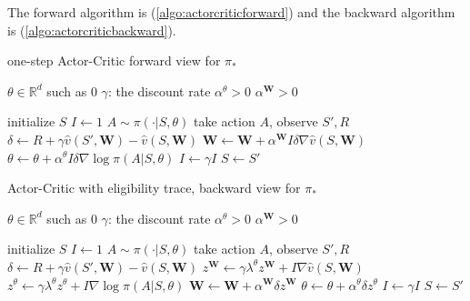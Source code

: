 The forward algorithm is (\ref{algo:actorcriticforward}) and the backward algorithm is (\ref{algo:actorcriticbackward}).


\begin{algorithm}
	\caption{one-step Actor-Critic forward view for $\pi_*$}\label{algo:actorcriticforward}	
	
	\begin{algorithmic}[1]
		\State $ \theta \in \mathbb{R}^d $ such as $0$
		\State $\gamma$: the discount rate
		\State $\alpha^\theta > 0$
		\State $\alpha^{\mathbf{W}} > 0$
		
		\Statex
		
		\Loop
			\State initialize $S$
			\State $I \gets 1$
			\Repeat
				\State $A \sim \pi(\cdot|S,\theta)$
				\State take action $A$, observe $S', R$
				\State $\delta \gets R + \gamma \widehat{v}(S',\mathbf{W}) - \widehat{v}(S,\mathbf{W})$ 
				\State $\mathbf{W} \gets \mathbf{W} + \alpha^{\mathbf{W}} I \delta \nabla \widehat{v}(S, \mathbf{W}) $
				\State $\theta \gets \theta + \alpha^\theta I \delta \nabla \log \pi(A|S,\theta) $
				\State $I \gets \gamma I$
				\State $S \gets S'$
		\EndLoop		
	\end{algorithmic}
\end{algorithm}


\begin{algorithm}
	\caption{Actor-Critic with eligibility trace, backward view for $\pi_*$}\label{algo:actorcriticbackward}	
	
	\begin{algorithmic}[1]
		\State $ \theta \in \mathbb{R}^d $ such as $0$
		\State $\gamma$: the discount rate
		\State $\alpha^\theta > 0$
		\State $\alpha^{\mathbf{W}} > 0$
		
		\Statex
		
		\Loop
			\State initialize $S$
			\State $I \gets 1$
			\Repeat
				\State $A \sim \pi(\cdot|S,\theta)$
				\State take action $A$, observe $S', R$
				\State $\delta \gets R + \gamma \widehat{v}(S',\mathbf{W}) - \widehat{v}(S,\mathbf{W})$ 
				\State $z^\mathbf{W} \gets \gamma \lambda^\theta z^\mathbf{W} + I \nabla \widehat{v}(S,\mathbf{W})$
				\State $z^\theta \gets \gamma \lambda^\theta z^\theta + I \nabla \log \pi(A|S, \theta)$
				\State $\mathbf{W} \gets \mathbf{W} + \alpha^\mathbf{W} \delta z^\mathbf{W}$
				\State $\theta \gets \theta + \alpha^\theta \delta z^\theta$
				\State $I \gets \gamma I$
				\State $S \gets S'$
		\EndLoop	
	\end{algorithmic}
\end{algorithm}

